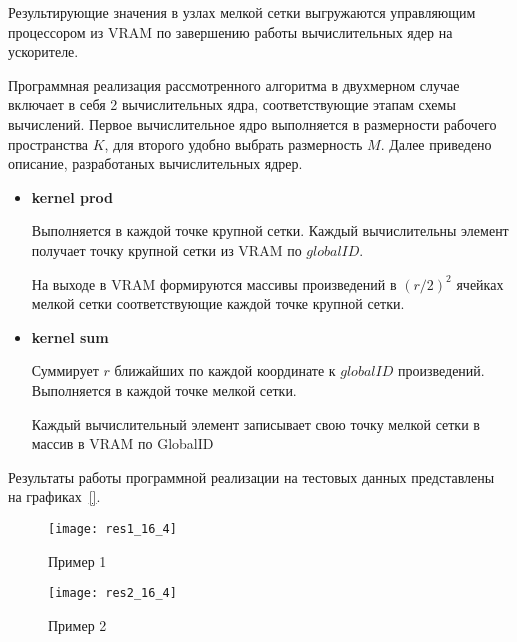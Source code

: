 Результирующие значения в узлах мелкой сетки выгружаются управляющим процессором
из VRAM по завершению работы вычислительных ядер на ускорителе.

Программная реализация рассмотренного алгоритма в двухмерном случае
включает в себя 2 вычислительных ядра, соответствующие этапам схемы вычислений.
Первое вычислительное ядро выполняется в размерности рабочего пространства $K$,
для второго удобно выбрать размерность $M$.
Далее приведено описание, разработаных вычислительных ядрер.
\begin{itemize}
\item
  {\bf kernel prod}

  Выполняется в каждой точке крупной сетки.
  Каждый вычислительны элемент 
  получает точку крупной сетки
  из VRAM по $globalID$. 
  

  На выходе в VRAM
  формируются массивы произведений в $(r/2)^2$ ячейках мелкой сетки  
  соответствующие каждой точке крупной сетки.

  
\item
  {\bf kernel sum}

  Суммирует $r$ ближайших по каждой координате к $globalID$ произведений. 
  Выполняется в каждой точке мелкой сетки.
  
  
  Каждый вычислительный элемент записывает свою точку мелкой сетки в
  массив в VRAM по GlobalID
\end{itemize}


Результаты работы программной реализации на тестовых данных представлены на графиках~\ref{}.

\begin{figure}[h!]
  \centering
  \texttt{[image: res1\_16\_4]} 
  \caption{Пример 1}
  \label{fig:res1}
\end{figure}
\FloatBarrier


\begin{figure}[h!]
  \centering
  \texttt{[image: res2\_16\_4]} 
  \caption{Пример 2}
  \label{fig:reg_net}
\end{figure}
\FloatBarrier





